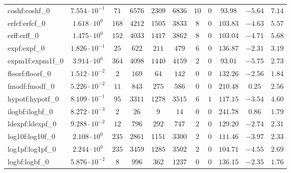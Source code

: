 \begin{tabular}{|l|c|c|c|c|c|c|c|c|c|c|}
coshf:coshf\_0               & $ 7.554 \cdot 10^{-1} $ & $ 71     $ & $ 6576   $ & $ 2309  $ & $ 6836   $ & $ 10  $ & $ 0 $ & $ 93.98       $ & $ -5.64   $ & $ 7.14    $ \\
erfcf:erfcf\_0               & $ 1.618 \cdot 10^{0}  $ & $ 168    $ & $ 4212   $ & $ 1505  $ & $ 3833   $ & $ 8   $ & $ 0 $ & $ 103.83      $ & $ -4.63   $ & $ 5.57    $ \\
erff:erff\_0                 & $ 1.475 \cdot 10^{0}  $ & $ 152    $ & $ 4033   $ & $ 1417  $ & $ 3862   $ & $ 8   $ & $ 0 $ & $ 103.04      $ & $ -4.71   $ & $ 5.68    $ \\
expf:expf\_0                 & $ 1.826 \cdot 10^{-1} $ & $ 25     $ & $ 622    $ & $ 211   $ & $ 479    $ & $ 6   $ & $ 0 $ & $ 136.87      $ & $ -2.31   $ & $ 3.19    $ \\
expm1f:expm1f\_0             & $ 3.914 \cdot 10^{0}  $ & $ 364    $ & $ 4098   $ & $ 1440  $ & $ 4159   $ & $ 2   $ & $ 0 $ & $ 93.01       $ & $ -5.75   $ & $ 2.73    $ \\
floorf:floorf\_0             & $ 1.512 \cdot 10^{-2} $ & $ 2      $ & $ 169    $ & $ 64    $ & $ 142    $ & $ 0   $ & $ 0 $ & $ 132.26      $ & $ -2.56   $ & $ 1.84    $ \\
fmodf:fmodf\_0               & $ 5.226 \cdot 10^{-2} $ & $ 11     $ & $ 843    $ & $ 275   $ & $ 586    $ & $ 0   $ & $ 0 $ & $ 210.48      $ & $ 0.25    $ & $ 2.56    $ \\
hypotf:hypotf\_0             & $ 8.109 \cdot 10^{-1} $ & $ 95     $ & $ 3311   $ & $ 1278  $ & $ 3515   $ & $ 6   $ & $ 1 $ & $ 117.15      $ & $ -3.54   $ & $ 4.60    $ \\
ilogbf:ilogbf\_0             & $ 8.272 \cdot 10^{-3} $ & $ 2      $ & $ 26     $ & $ 9     $ & $ 14     $ & $ 0   $ & $ 0 $ & $ 241.78      $ & $ 0.86    $ & $ 1.79    $ \\
ldexpf:ldexpf\_0             & $ 9.288 \cdot 10^{-2} $ & $ 12     $ & $ 796    $ & $ 292   $ & $ 747    $ & $ 2   $ & $ 0 $ & $ 129.20      $ & $ -2.74   $ & $ 2.31    $ \\
log10f:log10f\_0             & $ 2.108 \cdot 10^{0}  $ & $ 235    $ & $ 2861   $ & $ 1151  $ & $ 3300   $ & $ 2   $ & $ 0 $ & $ 111.46      $ & $ -3.97   $ & $ 2.33    $ \\
log1pf:log1pf\_0             & $ 2.244 \cdot 10^{0}  $ & $ 235    $ & $ 3459   $ & $ 1285  $ & $ 3502   $ & $ 2   $ & $ 0 $ & $ 104.71      $ & $ -4.55   $ & $ 2.69    $ \\
logbf:logbf\_0               & $ 5.876 \cdot 10^{-2} $ & $ 8      $ & $ 996    $ & $ 362   $ & $ 1237   $ & $ 0   $ & $ 0 $ & $ 136.15      $ & $ -2.35   $ & $ 1.76    $ \\

\end{tabular}
